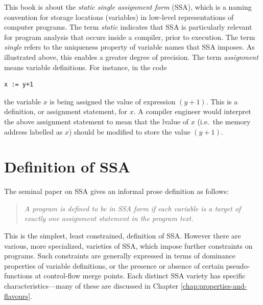 This book is about the \textit{static single assignment form} (SSA),
which is a naming convention for storage locations (variables)
in low-level representations
of computer programs.
The term \textit{static} indicates that SSA is particularly
relevant for program analysis that occurs inside a 
compiler, prior to execution.
The term \textit{single} refers to the uniqueness property of
variable names that SSA imposes. As illustrated above, this enables
a greater degree of precision.
The term \textit{assignment} means variable definitions. For
instance, in the code
\begin{verbatim}
x := y+1
\end{verbatim}
the variable $x$ is being assigned the value of expression $(y+1)$.
This is a definition, or assignment statement, for $x$.
A compiler engineer would interpret the above assignment statement
to mean that the lvalue of
$x$ (i.e.\ the memory address labelled as $x$) should be modified to store
the value $(y+1)$.


\section{Definition of SSA}


The seminal paper on SSA 
\cite{cytron91efficiently}
gives an informal prose
definition as follows:

\begin{quotation}
\textit{
A program is defined to be in SSA
form if each variable is a target of
exactly one assignment statement in the
program text.
}
\end{quotation}



This is the simplest,
least constrained, definition of SSA. However
there are various, more specialized, varieties of SSA,
which impose further constraints on programs.
Such constraints are generally expressed in terms
of dominance properties of variable definitions, or
the presence or absence of certain 
pseudo-functions at control-flow merge points.
Each distinct SSA variety has specific characteristics---many of
these are discussed in
Chapter \ref{chap:properties-and-flavours}.

